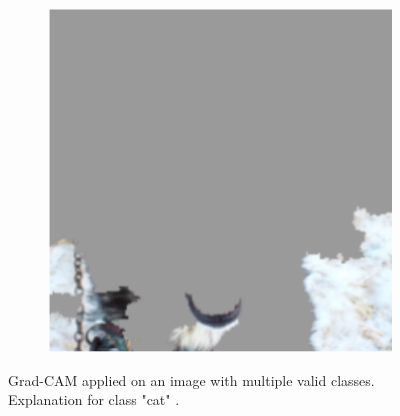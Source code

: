 \begin{figure}[H]
\begin{subfigure}{.5\textwidth}
        \includegraphics[width=0.95\linewidth]{images/wolf2.png}
        \caption{}
    \end{subfigure}
    \caption{Grad-CAM applied on an image with multiple valid classes. Explanation for class "cat" \cite{selvaraju2017grad}.}
    \label{grad_cam_cat}
\end{figure}

